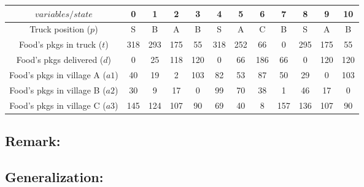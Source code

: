 \documentclass[a4paper]{article}
\begin{document}
\begin{description}
\begin{center}
\begin{tabular}{|c|c|c|c|c|c|c|c|c|c|c|c|}
  \hline
  $variables/state$ & 0 & 1 & 2 & 3 & 4 & 5 & 6 & 7 & 8 & 9 & 10  \\
  \hline
  Truck position ($p$) & S & B & A & B & S & A & C & B & S & A & B\\
  Food's pkgs in truck ($t$) & 318 & 293 & 175 & 55 & 318 & 252 & 66 & 0 & 295 & 175 & 55\\
  Food's pkgs delivered ($d$) & 0 & 25 & 118 & 120 & 0 & 66 & 186 & 66 & 0 & 120 & 120\\
  Food's pkgs in village A ($a1$) & 40  & 19  & 2   & 103 & 82 & 53 & 87 & 50  & 29  & 0   & 103 \\
  Food's pkgs in village B ($a2$) & 30  & 9   & 17  & 0   & 99 & 70 & 38 & 1   & 46  & 17  & 0  \\
  Food's pkgs in village C ($a3$) & 145 & 124 & 107 & 90  & 69 & 40 & 8  & 157 & 136 & 107 & 90  \\
  \hline
\end{tabular}
\end{center}
  
\end{description}


\subsection*{Remark:}


\subsection*{Generalization:}
\end{document}
